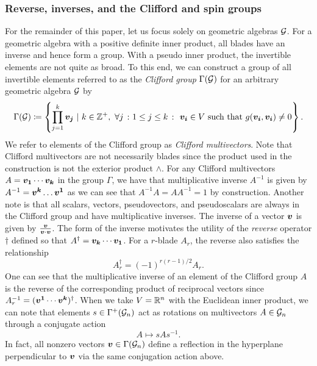 \subsubsection{Reverse, inverses, and the Clifford and spin groups}
\label{subsubsec:reverse_inverse_clifford_spin_groups}
For the remainder of this paper, let us focus solely on geometric algebras $\mathcal{G}$. For a geometric algebra with a positive definite inner product, all blades have an inverse and hence form a group. With a pseudo inner product, the invertible elements are not quite as broad. To this end, we can construct a group of all invertible elements referred to as the \emph{Clifford group} $\Gamma(\mathcal{G})$ for an arbitrary geometric algebra $\mathcal{G}$ by
\begin{equation}
\Gamma(\mathcal{G}) \coloneqq \left\{ \prod_{j=1}^k \boldsymbol{v_j} ~\vert~ k\in \mathbb{Z}^+,~ \forall j~\colon1\leq j \leq k~\colon~\boldsymbol{v_i} \in V ~\textrm{such that}~ g(\boldsymbol{v_i},\boldsymbol{v_i})\neq 0\right\}.
\end{equation}
We refer to elements of the Clifford group as \emph{Clifford multivectors}. Note that Clifford multivectors are not necessarily blades since the product used in the construction is not the exterior product $\wedge$. For any Clifford multivectors $A = \boldsymbol{v_1} \cdots \boldsymbol{v_k}$ in the group $\Gamma$, we have that multiplicative inverse $A^{-1}$ is given by $A^{-1} = \blade{v^k} \dots \blade{v^1}$ as we can see that $A^{-1}A=AA^{-1} = 1$ by construction.  Another note is that all scalars, vectors, pseudovectors, and pseudoscalars are always in the Clifford group and have multiplicative inverses. The inverse of a vector $\boldsymbol{v}$ is given by $\frac{\boldsymbol{v}}{\boldsymbol{v}\cdot\boldsymbol{v}}$. The form of the inverse motivates the utility of the \emph{reverse} operator $\dagger$ defined so that $A^\dagger = \boldsymbol{v_k} \cdots \boldsymbol{v_1}$. For a $r$-blade $A_r$, the reverse also satisfies the relationship
\begin{equation}
\label{eq:reverse_sign}
A_r^\dagger = (-1)^{r(r-1)/2} A_r.
\end{equation}
One can see that the multiplicative inverse of an element of the Clifford group $A$ is the reverse of the corresponding product of reciprocal vectors since $A_r^{-1} = (\boldsymbol{v^1} \cdots \boldsymbol{v^k})^\dagger$. When we take $V=\mathbb{R}^n$ with the Euclidean inner product, we can note that elements $s \in \Gamma^+(\mathcal{G}_n)$ act as rotations on multivectors $A\in \mathcal{G}_n$ through a conjugate action
\begin{equation}
A \mapsto s A s^{-1}.
\end{equation}
In fact, all nonzero vectors $\boldsymbol{v}\in\Gamma(\mathcal{G}_n)$ define a reflection in the hyperplane perpendicular to $\boldsymbol{v}$ via the same conjugation action above.

